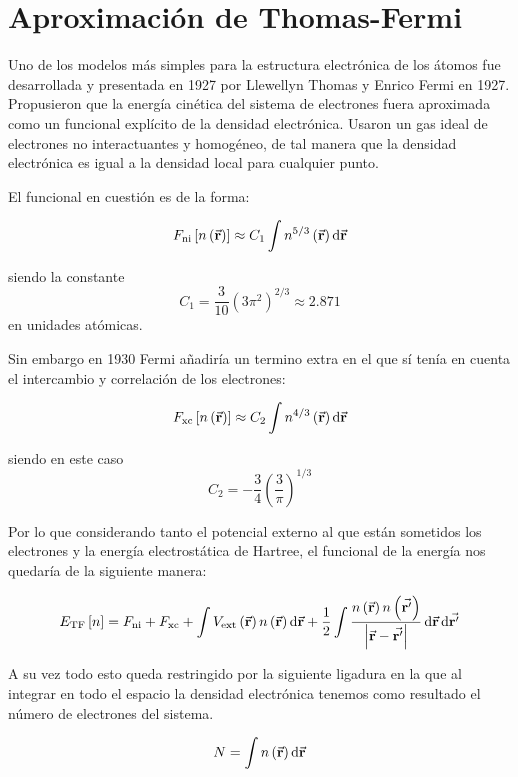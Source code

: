 \section{Aproximación de Thomas-Fermi}

Uno de los modelos más simples para la estructura electrónica de los átomos fue desarrollada y presentada en 1927 por Llewellyn Thomas y Enrico Fermi en 1927. Propusieron que la energía cinética del sistema de electrones fuera aproximada como un funcional explícito de la densidad electrónica. Usaron un gas ideal de electrones no interactuantes y homogéneo, de tal manera que la densidad electrónica es igual a la densidad local para cualquier punto.

El funcional en cuestión es de la forma:

\begin{equation}
    F_{\text{ni}} \left[ n \left( \va{r} \right) \right] \approx C_1 \int n^{5/3} \left( \va{r} \right) \dd{\va{r}}
\end{equation}

siendo la constante \begin{equation}
    C_1 = \frac{3}{10} (3 \pi^2)^{2/3} \approx 2.871
\end{equation} en unidades atómicas.

Sin embargo en 1930 Fermi añadiría un termino extra en el que sí tenía en cuenta el intercambio y correlación de los electrones:

\begin{equation}
    F_{\text{xc}}\left[ n \left( \va{r} \right) \right] \approx C_2 \int n^{4/3} \left( \va{r} \right) \dd{\va{r}}
\end{equation}

siendo en este caso \begin{equation}
    C_2 = - \frac{3}{4} \left( \frac{3}{\pi} \right)^{1/3}
\end{equation}

Por lo que considerando tanto el potencial externo al que están sometidos los electrones y la energía electrostática de Hartree, el funcional de la energía nos quedaría de la siguiente manera:

\begin{equation}
    E_{\text{TF}} \left[ n \right] = F_{\text{ni}} + F_{\text{xc}} + \int V_{\text{ext}} \left( \va{r} \right) n \left( \va{r} \right) \dd{\va{r}}  + \frac{1}{2} \int \frac{n \left( \va{r} \right) n \left( \va{r'} \right)}{\abs{ \va{r} - \va{r'} } } \dd{\va{r}} \dd{\va{r'}}
\end{equation}

A su vez todo esto queda restringido por la siguiente ligadura en la que al integrar en todo el espacio la densidad electrónica tenemos como resultado el número de electrones del sistema.

\begin{equation}
    N = \int n \left( \va{r} \right)  \dd{\va{r}}
\end{equation}
